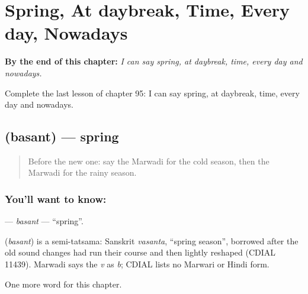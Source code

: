 
\chapter{Spring, At daybreak, Time, Every day, Nowadays}
\label{ch:mw-spring-at-daybreak-time-every-day-nowadays}

\begin{chapteropening}
\textbf{By the end of this chapter:} \emph{I can say spring, at daybreak, time, every day and nowadays.}

Complete the last lesson of chapter 95: I can say spring, at daybreak, time, every day and nowadays.
\end{chapteropening}

\section[\texorpdfstring{\mw{बसंत} (basant)}{बसंत (basant)}]{ (basant) — spring}

\label{lesson:MW-C95-basant}



\begin{quote}
Before the new one: say the Marwadi for the cold season, then the Marwadi for the rainy season.
\end{quote}

\subsection*{You'll want to know: }
\textbf{} — \emph{basant} — \textquotedblleft{}spring\textquotedblright{}.

\begin{cousinweb}
\textbf{} (\emph{basant}) is a semi-tatsama: Sanskrit \emph{vasanta}, \textquotedblleft{}spring season\textquotedblright{}, borrowed after the old sound changes had run their course and then lightly reshaped (CDIAL 11439). Marwadi says the \emph{v} as \emph{b}; CDIAL lists no Marwari or Hindi form.
\end{cousinweb}

\begin{grammarlens}[title={What you've built}]
One more word for this chapter.
\end{grammarlens}

